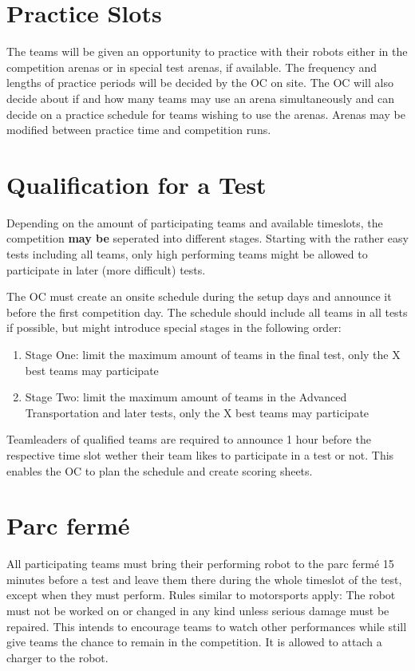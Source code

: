 \section{Practice Slots}

The teams will be given an opportunity to practice with their robots either in the competition arenas or in special test arenas, if available. The frequency and lengths of practice periods will be decided by the OC on site. The OC will also decide about if and how many teams may use an arena simultaneously and can decide on a practice schedule for teams wishing to use the arenas. Arenas may be modified between practice time and competition runs.


\section{Qualification for a Test}
\label{sec:qulaification for a test}

Depending on the amount of participating teams and available timeslots, 
the competition \textbf{may be} seperated into different stages.
Starting with the rather easy tests including all teams, only high performing teams might be allowed to participate in later (more difficult) tests.

The OC must create an onsite schedule during the setup days and announce it before the first competition day. 
The schedule should include all teams in all tests if possible,
but might introduce special stages in the following order:
\begin{enumerate}
\item Stage One: limit the maximum amount of teams in the final test, only the X best teams may participate
\item Stage Two: limit the maximum amount of teams in the Advanced Transportation and later tests, only the X best teams may participate
\end{enumerate}

Teamleaders of qualified teams are required to announce 1 hour before the respective time slot wether their team likes to participate in a test or not. 
This enables the OC to plan the schedule and create scoring sheets.

\section{Parc ferm\'e}

All participating teams must bring their performing robot to the parc ferm\'e 15 minutes before a test and leave them there during the whole timeslot of the test, except when they must perform.
Rules similar to motorsports apply: The robot must not be worked on or changed in any kind unless
serious damage must be repaired. This intends to encourage teams to watch other performances while still give teams the chance to remain in the competition. It is allowed to attach a charger to the robot.

